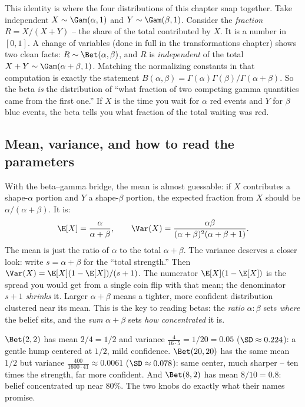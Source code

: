 \begin{whybox}
This identity is where the four distributions of this chapter snap together.
Take independent $X\sim\Gam(\alpha,1)$ and $Y\sim\Gam(\beta,1)$. Consider the
\emph{fraction} $R = X/(X+Y)$ -- the share of the total contributed by $X$. It
is a number in $[0,1]$. A change of variables (done in full in the
transformations chapter) shows two clean facts: $R\sim\Bet(\alpha,\beta)$, and
$R$ is \emph{independent} of the total $X+Y\sim\Gam(\alpha+\beta,1)$. Matching the
normalizing constants in that computation is exactly the statement
$B(\alpha,\beta) = \Gamma(\alpha)\Gamma(\beta)/\Gamma(\alpha+\beta)$. So the beta
\emph{is} the distribution of ``what fraction of two competing gamma quantities
came from the first one.'' If $X$ is the time you wait for $\alpha$ red events
and $Y$ for $\beta$ blue events, the beta tells you what fraction of the total
waiting was red.
\end{whybox}

\subsection{Mean, variance, and how to read the parameters}

With the beta--gamma bridge, the mean is almost guessable: if $X$ contributes a
shape-$\alpha$ portion and $Y$ a shape-$\beta$ portion, the expected fraction
from $X$ should be $\alpha/(\alpha+\beta)$. It is:
\[
  \E[X] = \frac{\alpha}{\alpha+\beta},
  \qquad
  \Var(X) = \frac{\alpha\beta}{(\alpha+\beta)^2(\alpha+\beta+1)}.
\]
The mean is just the ratio of $\alpha$ to the total $\alpha+\beta$. The variance
deserves a closer look: write $s = \alpha+\beta$ for the ``total strength.'' Then
$\Var(X) = \E[X](1-\E[X])/(s+1)$. The numerator $\E[X](1-\E[X])$ is the spread
you would get from a single coin flip with that mean; the denominator $s+1$
\emph{shrinks} it. Larger $\alpha+\beta$ means a tighter, more confident
distribution clustered near its mean. This is the key to reading betas: the
\emph{ratio} $\alpha:\beta$ sets \emph{where} the belief sits, and the
\emph{sum} $\alpha+\beta$ sets \emph{how concentrated} it is.

\begin{example}
\label{ch11:ex-readbeta}
$\Bet(2,2)$ has mean $2/4 = 1/2$ and variance
$\frac{4}{16\cdot5} = 1/20 = 0.05$ ($\SD\approx0.224$): a gentle hump centered at
$1/2$, mild confidence. $\Bet(20,20)$ has the same mean $1/2$ but variance
$\frac{400}{1600\cdot41}\approx0.0061$ ($\SD\approx0.078$): same center, much
sharper -- ten times the strength, far more confident. And $\Bet(8,2)$ has mean
$8/10 = 0.8$: belief concentrated up near $80\%$. The two knobs do exactly what
their names promise.
\end{example}

